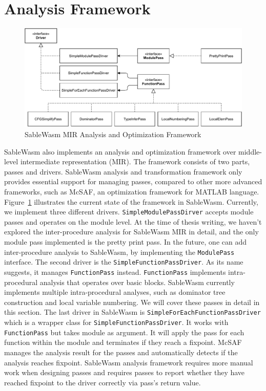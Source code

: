 \section{Analysis Framework}
\begin{figure}
    \centering
    \includegraphics[width=\textwidth]{Images/4.MIR/analysis-framework.pdf}
    \caption{SableWasm MIR Analysis and Optimization Framework}
    \label{fig:sablewasm-mir-analysis-framework}
\end{figure}
SableWasm also implements an analysis and optimization framework over middle-level intermediate representation (MIR). The framework consists of two parts, passes and drivers. SableWasm analysis and transformation framework only provides essential support for managing passes, compared to other more advanced frameworks, such as McSAF\cite{mcsaf}, an optimization framework for MATLAB language. Figure~\ref{fig:sablewasm-mir-analysis-framework} illustrates the current state of the framework in SableWasm. Currently, we implement three different drivers. \texttt{SimpleModulePassDirver} accepts module passes and operates on the module level. At the time of thesis writing, we haven't explored the inter-procedure analysis for SableWasm MIR in detail, and the only module pass implemented is the pretty print pass. In the future, one can add inter-procedure analysis to SableWasm, by implementing the \texttt{ModulePass} interface. The second driver is the \texttt{SimpleFunctionPassDriver}. As its name suggests, it manages \texttt{FunctionPass} instead. \texttt{FunctionPass} implements intra-procedural analysis that operates over basic blocks. SableWasm currently implements multiple intra-procedural analyses, such as dominator tree construction and local variable numbering. We will cover these passes in detail in this section. The last driver in SableWasm is \texttt{SimpleForEachFunctionPassDriver} which is a wrapper class for \texttt{SimpleFunctionPassDriver}. It works with \texttt{FunctionPass} but takes module as argument. It will apply the pass for each function within the module and terminates if they reach a fixpoint. McSAF manages the analysis result for the passes and automatically detects if the analysis reaches fixpoint. SableWasm analysis framework requires more manual work when designing passes and requires passes to report whether they have reached fixpoint to the driver correctly via pass's return value.




